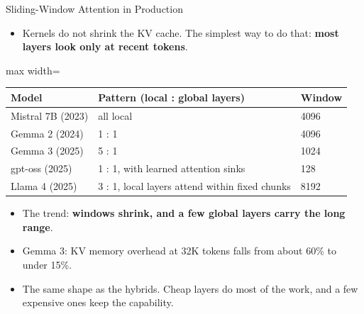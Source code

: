 \begin{frame}{Sliding-Window Attention in Production}
    \begin{itemize}\itemsep0.3em
        \item Kernels do not shrink the KV cache. The simplest way to do that: \textbf{most layers look only at recent tokens}.
    \end{itemize}
    \begin{center}
    \small
    \renewcommand{\arraystretch}{1.15}
    \begin{adjustbox}{max width=\linewidth}\begin{tabular}{lll}
        \toprule
        \textbf{Model} & \textbf{Pattern (local : global layers)} & \textbf{Window} \\
        \midrule
        Mistral 7B (2023) & all local & 4096 \\
        Gemma 2 (2024) & 1 : 1 & 4096 \\
        Gemma 3 (2025) & 5 : 1 & 1024 \\
        gpt-oss (2025) & 1 : 1, with learned attention sinks & 128 \\
        Llama 4 (2025) & 3 : 1, local layers attend within fixed chunks & 8192 \\
        \bottomrule
    \end{tabular}\end{adjustbox}
    \end{center}
    \begin{itemize}\itemsep0.3em
        \item The trend: \textbf{windows shrink, and a few global layers carry the long range}.
        \item Gemma 3: KV memory overhead at 32K tokens falls from about 60\% to under 15\%.
        \item The same shape as the hybrids. Cheap layers do most of the work, and a few expensive ones keep the capability.
    \end{itemize}
\end{frame}

